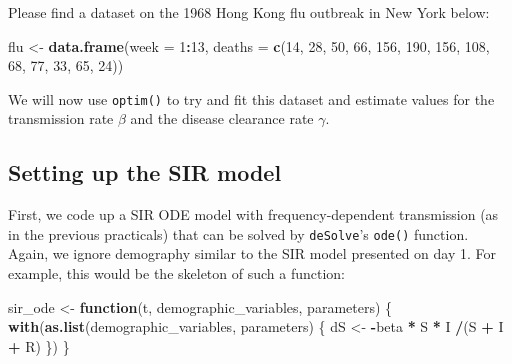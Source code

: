 \documentclass[
]{book}
\newenvironment{Shaded}{\begin{snugshade}}{\end{snugshade}}
\newcommand{\AttributeTok}[1]{\textcolor[rgb]{0.13,0.29,0.53}{#1}}
\newcommand{\ControlFlowTok}[1]{\textcolor[rgb]{0.13,0.29,0.53}{\textbf{#1}}}
\newcommand{\DecValTok}[1]{\textcolor[rgb]{0.00,0.00,0.81}{#1}}
\newcommand{\FunctionTok}[1]{\textcolor[rgb]{0.13,0.29,0.53}{\textbf{#1}}}
\newcommand{\NormalTok}[1]{#1}
\newcommand{\OtherTok}[1]{\textcolor[rgb]{0.56,0.35,0.01}{#1}}
\newcommand{\SpecialCharTok}[1]{\textcolor[rgb]{0.81,0.36,0.00}{\textbf{#1}}}
\theoremstyle{definition}
\theoremstyle{definition}
\theoremstyle{definition}
\theoremstyle{definition}
\theoremstyle{remark}
\begin{document}
Please find a dataset on the 1968 Hong Kong flu outbreak in New York below:

\begin{Shaded}
\begin{Highlighting}[]
\NormalTok{flu }\OtherTok{\textless{}{-}} \FunctionTok{data.frame}\NormalTok{(}\AttributeTok{week =} \DecValTok{1}\SpecialCharTok{:}\DecValTok{13}\NormalTok{,}
                  \AttributeTok{deaths =} \FunctionTok{c}\NormalTok{(}\DecValTok{14}\NormalTok{, }\DecValTok{28}\NormalTok{, }\DecValTok{50}\NormalTok{, }\DecValTok{66}\NormalTok{, }\DecValTok{156}\NormalTok{, }\DecValTok{190}\NormalTok{, }\DecValTok{156}\NormalTok{, }\DecValTok{108}\NormalTok{, }\DecValTok{68}\NormalTok{, }\DecValTok{77}\NormalTok{, }\DecValTok{33}\NormalTok{, }\DecValTok{65}\NormalTok{, }\DecValTok{24}\NormalTok{))}
\end{Highlighting}
\end{Shaded}

We will now use \texttt{optim()} to try and fit this dataset
and estimate values for the transmission rate \(\beta\)
and the disease clearance rate \(\gamma\).

\subsection{Setting up the SIR model}\label{setting-up-the-sir-model}

First, we code up a SIR ODE model with frequency-dependent transmission (as in the previous practicals) that can
be solved by \texttt{deSolve}'s \texttt{ode()} function.
Again, we ignore demography similar to the SIR model presented on day 1.
For example, this would be the skeleton of such
a function:

\begin{Shaded}
\begin{Highlighting}[]
\NormalTok{sir\_ode }\OtherTok{\textless{}{-}} \ControlFlowTok{function}\NormalTok{(t, demographic\_variables, parameters)}
\NormalTok{\{}
    \FunctionTok{with}\NormalTok{(}\FunctionTok{as.list}\NormalTok{(demographic\_variables, parameters)}
\NormalTok{         \{}
\NormalTok{           dS }\OtherTok{\textless{}{-}} \SpecialCharTok{{-}}\NormalTok{beta }\SpecialCharTok{*}\NormalTok{ S }\SpecialCharTok{*}\NormalTok{ I }\SpecialCharTok{/}\NormalTok{(S }\SpecialCharTok{+}\NormalTok{ I }\SpecialCharTok{+}\NormalTok{ R) }
\NormalTok{    \}) }
\NormalTok{\}}
\end{Highlighting}
\end{Shaded}
\end{document}

